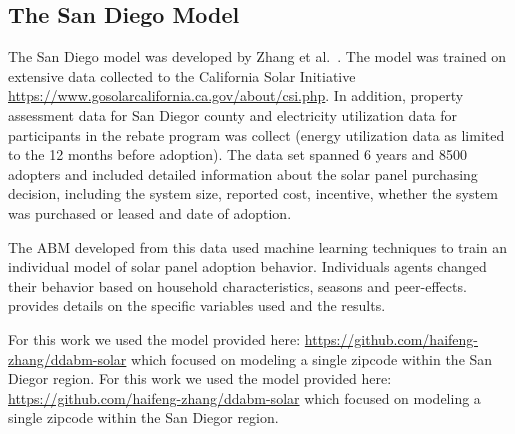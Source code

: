 \subsection{The San Diego Model} \label{san-diego-model}


The San Diego model was developed by Zhang et al.~\cite{zhang16solar}. The model was trained on extensive data collected to the California Solar Initiative \url{https://www.gosolarcalifornia.ca.gov/about/csi.php}. In addition, property assessment data for San Diegor county and electricity utilization data for participants in the rebate program was collect (energy utilization data as limited to the 12 months before adoption). The data set spanned 6 years and 8500 adopters and included detailed information about the solar panel purchasing decision, including the system size, reported cost, incentive, whether the system was purchased or leased and date of adoption.

The ABM developed from this data used machine learning techniques to train an individual model of solar panel adoption behavior. Individuals agents changed their behavior based on household characteristics, seasons and peer-effects. \cite{zhang16solar} provides details on the specific variables used and the results. 

For this work we used the model provided here: \url{https://github.com/haifeng-zhang/ddabm-solar} which focused on modeling a single zipcode within the San Diegor region. For this work we used the model provided here: \url{https://github.com/haifeng-zhang/ddabm-solar} which focused on modeling a single zipcode within the San Diegor region. 

